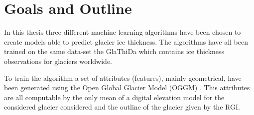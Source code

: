 %
%


\section{Goals and Outline}\label{goals}
In this thesis three different machine learning algorithms have been chosen to  create models able to predict glacier ice thickness. The algorithms have all been trained on the same data-set the GlaThiDa which contains ice thickness observations for glaciers worldwide.

To train the algorithm a set of attributes (features), mainly geometrical, have been generated using the Open Global Glacier Model (OGGM) \cite{OGGM2019}. This attributes are all computable by the only mean of a digital elevation model for the considered glacier considered and the outline of the glacier given by the RGI.

